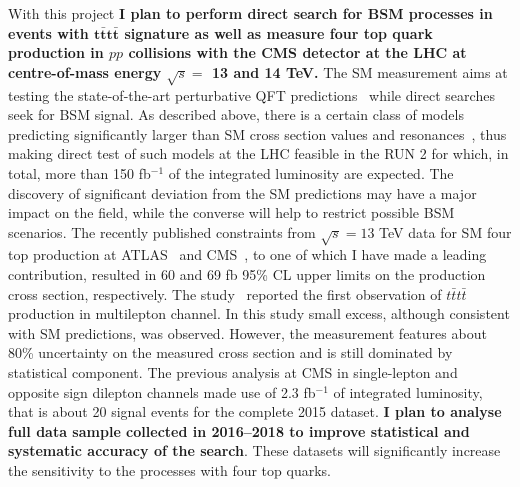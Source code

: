 \textcolor{\mycolor}{
With this project \textbf{I plan to perform direct search for BSM processes in events with $\pmb{t\bar{t}t\bar{t}}$ signature  as well as measure four top quark production in $pp$ collisions with the CMS detector at the LHC at centre-of-mass energy $\sqrt{s}=$ 13 and 14 TeV.} The SM measurement aims at testing the state-of-the-art perturbative QFT predictions~\cite{Bevilacqua:2012em,Frederix:2017wme} while direct searches seek for BSM signal. As described above, there is a certain class of models predicting significantly larger than SM cross section values and resonances~\cite{Lillie:2007hd, Gregoire:2011ka, Pomarol:2008bh}, thus making direct test of such models at the LHC feasible in the RUN 2 for which, in total, more than 150 fb$^{-1}$ of the integrated luminosity are expected. The discovery of significant deviation from the SM predictions may have a major impact on the field, while the converse will help to restrict possible BSM scenarios. The recently published constraints from $\sqrt{s}=13$ TeV data for SM four top production at ATLAS~\cite{Aaboud:2017faq} and CMS~\cite{Sirunyan:2017tep}, to one of which I have made a leading contribution,
resulted in 60 and 69 fb 95\% CL upper limits on the production cross section, respectively. The study~\cite{Sirunyan:2017roi} reported the first observation of $t\bar{t}t\bar{t}$ production in multilepton channel. In this study small excess, although consistent with SM predictions, was observed. However, the measurement features about 80\% uncertainty on the measured cross section and is still dominated by statistical component.
}
\textcolor{\mycolor}{
The previous analysis at CMS in single-lepton and opposite sign dilepton channels made use of 2.3 fb$^{-1}$ of integrated luminosity, that is about 20 signal events for the complete 2015 dataset. \textbf{I plan to analyse full data sample collected in 2016--2018 to improve statistical and systematic accuracy of the search}. These datasets will significantly increase the sensitivity to the processes with four top quarks.}

